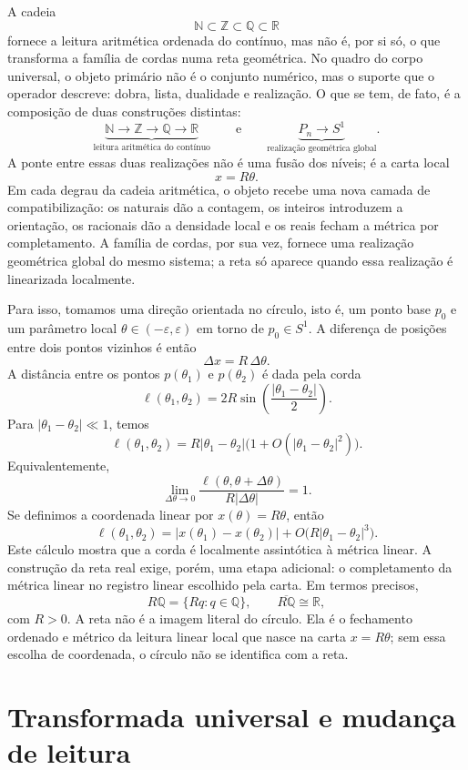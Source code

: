 \documentclass[11pt,a4paper]{article}
\begin{document}
A cadeia
\[
\mathbb N\subset\mathbb Z\subset\mathbb Q\subset\mathbb R
\]
fornece a leitura aritmética ordenada do contínuo, mas não é, por si só, o que transforma a família de cordas numa reta geométrica. No quadro do corpo universal, o objeto primário não é o conjunto numérico, mas o suporte que o operador descreve: dobra, lista, dualidade e realização. O que se tem, de fato, é a composição de duas construções distintas:
\[
\boxed{\underbrace{\mathbb N\to\mathbb Z\to\mathbb Q\to\mathbb R}_{\text{leitura aritmética do contínuo}}}
\qquad\text{e}\qquad
\boxed{\underbrace{P_n\to S^1}_{\text{realização geométrica global}}.}
\]
A ponte entre essas duas realizações não é uma fusão dos níveis; é a carta local
\[
\boxed{x=R\theta.}
\]
Em cada degrau da cadeia aritmética, o objeto recebe uma nova camada de compatibilização: os naturais dão a contagem, os inteiros introduzem a orientação, os racionais dão a densidade local e os reais fecham a métrica por completamento. A família de cordas, por sua vez, fornece uma realização geométrica global do mesmo sistema; a reta só aparece quando essa realização é linearizada localmente.

Para isso, tomamos uma direção orientada no círculo, isto é, um ponto base $p_0$ e um parâmetro local $\theta\in(-\varepsilon,\varepsilon)$ em torno de $p_0\in S^1$. A diferença de posições entre dois pontos vizinhos é então
\[
\Delta x = R\,\Delta \theta.
\]
A distância entre os pontos $p(\theta_1)$ e $p(\theta_2)$ é dada pela corda
\[
\ell(\theta_1,\theta_2)=2R\sin\left(\frac{|\theta_1-\theta_2|}{2}\right).
\]
Para $|\theta_1-\theta_2|\ll 1$, temos
\[
\ell(\theta_1,\theta_2)
=
R|\theta_1-\theta_2|\bigl(1+O(|\theta_1-\theta_2|^2)\bigr).
\]
Equivalentemente,
\[
\boxed{
\lim_{\Delta\theta\to0}
\frac{\ell(\theta,\theta+\Delta\theta)}{R|\Delta\theta|}=1.
}
\]
Se definimos a coordenada linear por $x(\theta)=R\theta$, então
\[
\ell(\theta_1,\theta_2)=|x(\theta_1)-x(\theta_2)|+O\!\bigl(R|\theta_1-\theta_2|^3\bigr).
\]
Este cálculo mostra que a corda é localmente assintótica à métrica linear. A construção da reta real exige, porém, uma etapa adicional: o completamento da métrica linear no registro linear escolhido pela carta. Em termos precisos,
\[
R\mathbb Q=\{Rq:q\in\mathbb Q\},\qquad \overline{R\mathbb Q}\cong\mathbb R,
\]
com $R>0$. A reta não é a imagem literal do círculo. Ela é o fechamento ordenado e métrico da leitura linear local que nasce na carta $x=R\theta$; sem essa escolha de coordenada, o círculo não se identifica com a reta.

\section{Transformada universal e mudança de leitura}
\end{document}
